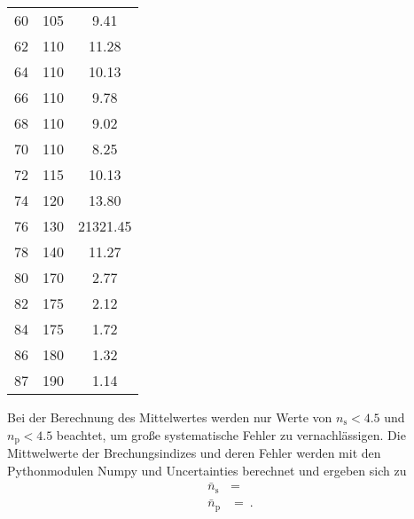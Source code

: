 \begin{table}[H]
\begin{tabular}{S[table-format=2.0] S S[table-format=2.2]}
    60 & 105 &  9.41\\
    62 & 110 &  11.28\\
    64 & 110 &  10.13\\
    66 & 110 &  9.78\\
    68 & 110 &  9.02\\
    70 & 110 &  8.25\\
    72 & 115 &  10.13\\
    74 & 120 &  13.80\\
    76 & 130 &  21321.45\\
    78 & 140 &  11.27\\
    80 & 170 &  2.77\\
    82 & 175 &  2.12\\
    84 & 175 &  1.72\\
    86 & 180 &  1.32\\
    87 & 190 &  1.14\\
   \bottomrule
  \end{tabular}
\end{table}


Bei der Berechnung des Mittelwertes werden nur Werte von $n_{\text{s}}<4.5$ und $n_{\text{p}}<4.5$
beachtet, um große systematische Fehler zu vernachlässigen.
Die Mittwelwerte der Brechungsindizes und deren Fehler werden mit den Pythonmodulen Numpy \cite{numpy} und Uncertainties \cite{uncertainties} berechnet
und ergeben sich zu
\begin{align*}
  \bar{n}_{\text{s}}&=\qty{}{} \\
  \bar{n}_{\text{p}}&=\qty{}{}.
\end{align*}


